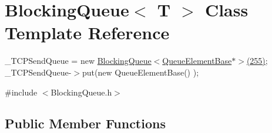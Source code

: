 \hypertarget{classBlockingQueue}{}\section{Blocking\+Queue$<$ T $>$ Class Template Reference}
\label{classBlockingQueue}


\+\_\+\+T\+C\+P\+Send\+Queue = new \hyperlink{classBlockingQueue}{Blocking\+Queue$<$\+Queue\+Element\+Base$\ast$$>$(255)}; \+\_\+\+T\+C\+P\+Send\+Queue-\/$>$put(new Queue\+Element\+Base() );  




{\ttfamily \#include $<$Blocking\+Queue.\+h$>$}

\subsection*{Public Member Functions}
